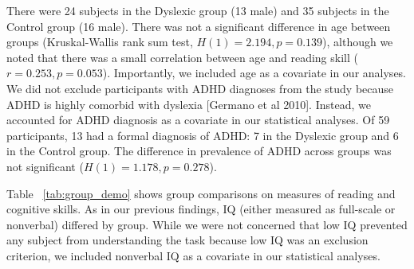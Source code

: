 \documentclass[../uwthesis.tex]{subfiles}
\begin{document}
There were 24 subjects in the Dyslexic group (13 male) and 35 subjects in the Control group (16 male). There was not a significant difference in age between groups (Kruskal-Wallis rank sum test, $H(1)=2.194, p=0.139$), although we noted that there was a small correlation between age and reading skill ($r = 0.253, p = 0.053$). Importantly, we included age as a covariate in our analyses. We did not exclude participants with ADHD diagnoses from the study because ADHD is highly comorbid with dyslexia [Germano et al 2010]. Instead, we accounted for ADHD diagnosis as a covariate in our statistical analyses. Of 59 participants, 13 had a formal diagnosis of ADHD: 7 in the Dyslexic group and 6 in the Control group. The difference in prevalence of ADHD across groups was not significant ($H(1) = 1.178, p=0.278$).

Table ~\ref{tab:group_demo} shows group comparisons on measures of reading and cognitive skills. As in our previous findings, IQ (either measured as full-scale or nonverbal) differed by group. While we were not concerned that low IQ prevented any subject from understanding the task because low IQ was an exclusion criterion, we included nonverbal IQ as a covariate in our statistical analyses. 
\end{document}
